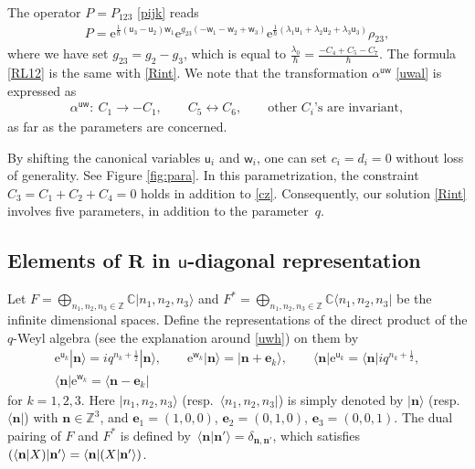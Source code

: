 \documentclass[pdftex]{sigma}
\newcommand{\Z}{{\mathbb Z}}
\newcommand{\C}{{\mathbb C}}
\newcommand{\e}{{\mathrm e}}
\newcommand{\uu}{{\mathsf u}}
\newcommand{\ww}{{\mathsf w}}
\numberwithin{equation}{section}
\begin{document}
The operator $P=P_{123}$ \eqref{pijk} reads
\begin{align}\label{pp123}
P=
\e^{\tfrac{1}{\hbar}(\uu_3-\uu_2)\ww_1}
\e^{g_{23}(-\ww_1-\ww_2+\ww_3)}
\e^{\tfrac{1}{\hbar}(\lambda_1\uu_1+\lambda_2\uu_2+\lambda_3\uu_3)}\rho_{23},
\end{align}
where we have set $g_{23}=g_2-g_3$, which is equal to
$\frac{\lambda_0}{\hbar}= \frac{-C_4+C_5-C_7}{\hbar}$.
The formula \eqref{RL12} is the same with \eqref{Rint}.
We note that the transformation $\alpha^{\uu\ww}$ \eqref{uwal} is expressed as
\begin{align}\label{alC}
\alpha^{\uu\ww}\colon\ C_1 \rightarrow -C_1,\qquad C_5 \leftrightarrow C_6,
\qquad \text{other $C_i$'s are invariant},
\end{align}
as far as the parameters are concerned.

\begin{Remark}\label{re:X}
By shifting the canonical variables $\uu_i$ and $\ww_i$, one can set $c_i = d_i = 0$ without loss of generality.
See Figure \ref{fig:para}. In this parametrization, the constraint $C_3 = C_1 + C_2 + C_4 = 0$ holds in addition to \eqref{cz}.
Consequently, our solution \eqref{Rint} involves five parameters, in addition to the parameter~$q$.
\end{Remark}

\subsection[Elements of R in u-diagonal representation]{Elements of $\boldsymbol{R}$ in $\boldsymbol{\uu}$-diagonal representation}\label{ss:ud}

Let $F= \bigoplus_{n_1,n_2,n_3 \in \Z}\C |n_1,n_2,n_3\rangle$
and $F^\ast = \bigoplus_{n_1,n_2,n_3 \in \Z}\C \langle n_1,n_2,n_3|$ be the infinite dimensional spaces.
Define the representations of the direct product of the $q$-Weyl algebra
(see the explanation around \eqref{uwh}) on them by
\begin{gather}
\e^{\uu_k}|\mathbf{n}\rangle = i q^{n_k+\tfrac{1}{2}}|\mathbf{n}\rangle,
\qquad
\e^{\ww_k}|\mathbf{n}\rangle = |\mathbf{n} + \mathbf{e}_k\rangle,
\qquad
\langle \mathbf{n}|\e^{\uu_k}=\langle \mathbf{n}| i q^{n_k+\tfrac{1}{2}},\nonumber
\\
\langle \mathbf{n}|\e^{\ww_k} = \langle \mathbf{n} - \mathbf{e}_k|\label{qrep}
\end{gather}
for $k=1,2,3$. Here $|n_1,n_2,n_3\rangle$ (resp.\
$\langle n_1,n_2, n_3|$) is simply denoted by $|\mathbf{n}\rangle$
(resp.\ $\langle \mathbf{n}|$) with $\mathbf{n} \in \Z^3$, and
$\mathbf{e}_1=(1,0,0)$, $\mathbf{e}_2=(0,1,0)$, $\mathbf{e}_3=(0,0,1)$. The
dual pairing of $F$ and $F^\ast$ is defined by~${\langle \mathbf{n}|\mathbf{n}'\rangle = \delta_{\mathbf{n}, \mathbf{n}'}}$,
which satisfies
$(\langle \mathbf{n}|X) |\mathbf{n}'\rangle = \langle \mathbf{n}|(X|{\bf
 n}'\rangle)$.
\end{document}
